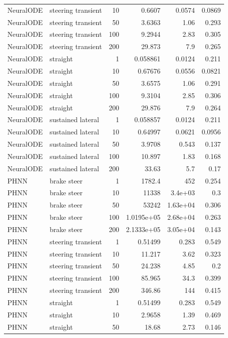 \begin{tabular}{llrrrr}
NeuralODE & steering transient & 10 & 0.6607 & 0.0574 & 0.0869 \\
NeuralODE & steering transient & 50 & 3.6363 & 1.06 & 0.293 \\
NeuralODE & steering transient & 100 & 9.2944 & 2.83 & 0.305 \\
NeuralODE & steering transient & 200 & 29.873 & 7.9 & 0.265 \\
NeuralODE & straight & 1 & 0.058861 & 0.0124 & 0.211 \\
NeuralODE & straight & 10 & 0.67676 & 0.0556 & 0.0821 \\
NeuralODE & straight & 50 & 3.6575 & 1.06 & 0.291 \\
NeuralODE & straight & 100 & 9.3104 & 2.85 & 0.306 \\
NeuralODE & straight & 200 & 29.876 & 7.9 & 0.264 \\
NeuralODE & sustained lateral & 1 & 0.058857 & 0.0124 & 0.211 \\
NeuralODE & sustained lateral & 10 & 0.64997 & 0.0621 & 0.0956 \\
NeuralODE & sustained lateral & 50 & 3.9708 & 0.543 & 0.137 \\
NeuralODE & sustained lateral & 100 & 10.897 & 1.83 & 0.168 \\
NeuralODE & sustained lateral & 200 & 33.63 & 5.7 & 0.17 \\
PHNN & brake steer & 1 & 1782.4 & 452 & 0.254 \\
PHNN & brake steer & 10 & 11338 & 3.4e+03 & 0.3 \\
PHNN & brake steer & 50 & 53242 & 1.63e+04 & 0.306 \\
PHNN & brake steer & 100 & 1.0195e+05 & 2.68e+04 & 0.263 \\
PHNN & brake steer & 200 & 2.1333e+05 & 3.05e+04 & 0.143 \\
PHNN & steering transient & 1 & 0.51499 & 0.283 & 0.549 \\
PHNN & steering transient & 10 & 11.217 & 3.62 & 0.323 \\
PHNN & steering transient & 50 & 24.238 & 4.85 & 0.2 \\
PHNN & steering transient & 100 & 85.965 & 34.3 & 0.399 \\
PHNN & steering transient & 200 & 346.86 & 144 & 0.415 \\
PHNN & straight & 1 & 0.51499 & 0.283 & 0.549 \\
PHNN & straight & 10 & 2.9658 & 1.39 & 0.469 \\
PHNN & straight & 50 & 18.68 & 2.73 & 0.146 \\

\end{tabular}

